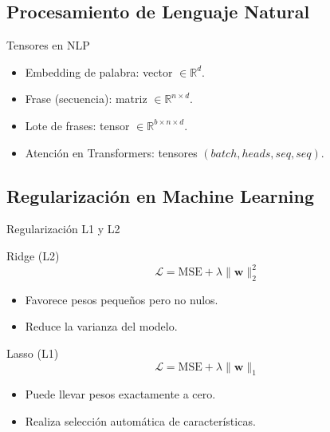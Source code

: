 \documentclass[aspectratio=169, 10pt, xcolor=table]{beamer}
\begin{document}
\subsection{Procesamiento de Lenguaje Natural}

\begin{frame}{Tensores en NLP}
    \begin{itemize}
        \item Embedding de palabra: vector $\in \mathbb{R}^{d}$.
        \item Frase (secuencia): matriz $\in \mathbb{R}^{n \times d}$.
        \item Lote de frases: tensor $\in \mathbb{R}^{b \times n \times d}$.
        \item Atención en Transformers: tensores $(batch, heads, seq, seq)$.
    \end{itemize}
\end{frame}

\subsection{Regularización en Machine Learning}

\begin{frame}{Regularización L1 y L2}
    \begin{block}{Ridge (L2)}
        \[
        \mathcal{L} = \text{MSE} + \lambda \|\mathbf{w}\|_2^2
        \]
        \begin{itemize}
            \item Favorece pesos pequeños pero no nulos.
            \item Reduce la varianza del modelo.
        \end{itemize}
    \end{block}
    \begin{block}{Lasso (L1)}
        \[
        \mathcal{L} = \text{MSE} + \lambda \|\mathbf{w}\|_1
        \]
        \begin{itemize}
            \item Puede llevar pesos exactamente a cero.
            \item Realiza selección automática de características.
        \end{itemize}
    \end{block}
\end{frame}

\end{document}
